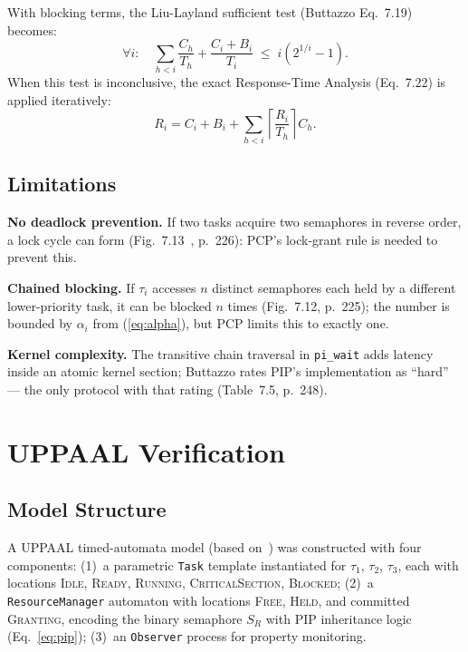 \documentclass[conference]{IEEEtran}
\begin{document}
With blocking terms, the Liu-Layland sufficient test (Buttazzo Eq.~7.19)
becomes:
\begin{equation}
  \forall i:\quad \sum_{h<i}\frac{C_h}{T_h} + \frac{C_i + B_i}{T_i}
  \;\leq\; i\!\left(2^{1/i}-1\right).
  \label{eq:ll}
\end{equation}
When this test is inconclusive, the exact Response-Time Analysis
(Eq.~7.22) is applied iteratively:
\begin{equation}
  R_i = C_i + B_i + \sum_{h<i}\!\left\lceil\frac{R_i}{T_h}\right\rceil C_h.
  \label{eq:rta}
\end{equation}

\subsection{Limitations}

\textbf{No deadlock prevention.} If two tasks acquire two semaphores
in reverse order, a lock cycle can form (Fig.~7.13~\cite{Buttazzo2011},
p.~226): PCP's lock-grant rule is needed to prevent this.

\textbf{Chained blocking.} If $\tau_i$ accesses $n$ distinct
semaphores each held by a different lower-priority task, it can be blocked
$n$ times (Fig.~7.12, p.~225); the number is bounded by $\alpha_i$
from (\ref{eq:alpha}), but PCP limits this to exactly one.

\textbf{Kernel complexity.} The transitive chain traversal in
\texttt{pi\_wait} adds latency inside an atomic kernel section;
Buttazzo rates PIP's implementation as ``hard'' --- the only protocol
with that rating (Table~7.5, p.~248).

\section{UPPAAL Verification}
\label{sec:uppaal}

\subsection{Model Structure}

A UPPAAL timed-automata model (based on~\cite{Behrmann2004}) was
constructed with four components:
(1)~a parametric \texttt{Task} template instantiated for $\tau_1$,
$\tau_2$, $\tau_3$, each with locations \textsc{Idle}, \textsc{Ready},
\textsc{Running}, \textsc{CriticalSection}, \textsc{Blocked};
(2)~a \texttt{ResourceManager} automaton with locations
\textsc{Free}, \textsc{Held}, and committed \textsc{Granting},
encoding the binary semaphore $S_R$ with PIP inheritance logic
(Eq.~\ref{eq:pip});
(3)~an \texttt{Observer} process for property monitoring.
\end{document}
